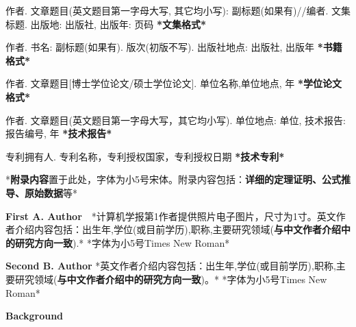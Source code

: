 \documentclass[10.5pt,compsoc]{CjC}
\theoremstyle{mystyle}
\begin{document}
\begin{CJK*}{UTF8}{song}
\begin{thebibliography}{99}
作者. 文章题目(英文题目第一字母大写, 其它均小写):
副标题(如果有)//编者. 文集标题. 出版地: 出版社, 出版年: 页码
\textbf{*文集格式*}

作者. 书名: 副标题(如果有). 版次(初版不写). 出版社地点: 出版社,
出版年 \textbf{*书籍格式*}

作者. 文章题目[博士学位论文/硕士学位论文]. 单位名称,单位地点, 年
\textbf{*学位论文格式*}

作者. 文章题目(英文题目第一字母大写，其它均小写). 单位地点: 单位,
技术报告: 报告编号, 年 \textbf{*技术报告*}

专利拥有人. 专利名称，专利授权国家，专利授权日期
\textbf{*技术专利*}
  \end{thebibliography}

\begin{strip}
\end{strip}


{\setlength\parindent{2em}
*\textbf{附录内容}置于此处，字体为小5号宋体。附录内容包括：\textbf{详细的定理证明、公式推导、原始数据}等*}

\begin{strip}
\end{strip}

\begin{biography}
\noindent
\textbf{First A. Author}\ \ *计算机学报第1作者提供照片电子图片，尺寸为1寸。英文作者介绍内容包括：出生年,学位(或目前学历),职称,主要研究领域(\textbf{与中文作者介绍中的研究方向一致}).*
*字体为小5号Times New Roman*

\end{biography}

\begin{biography}
\noindent
\textbf{Second B. Author} *英文作者介绍内容包括：出生年,学位(或目前学历),职称,主要研究领域(\textbf{与中文作者介绍中的研究方向一致})。*
*字体为小5号Times New Roman*
\end{biography}
\begin{strip}
\end{strip}
\noindent \textbf{Background}


\end{CJK*}
\end{document}
